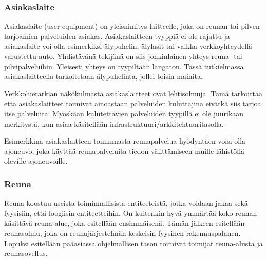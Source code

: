

\subsubsection{Asiakaslaite}
Asiakaslaite (user equipment) on yleisnimitys laitteelle, joka on reunan tai pilven tarjoamien palveluiden asiakas. 
Asiakaslaitteen tyyppiä ei ole rajattu ja asiakaslaite voi olla esimerkiksi älypuhelin, älylasit tai vaikka verkkoyhteydellä varustettu auto. 
Yhdistävänä tekijänä on siis jonkinlainen yhteys reuna- tai pilvipalveluihin. Yleisesti yhteys on tyypiltään langaton. 
Tässä tutkielmassa asiakaslaitteella tarkoitetaan älypuhelinta, jollei toisin mainita.

Verkkohierarkian näkökulmasta asiakaslaitteet ovat lehtisolmuja. Tämä tarkoittaa että asiakaslaitteet toimivat ainoastaan palveluiden kuluttajina eivätkä siis tarjoa itse palveluita. Myöskään kulutettavien palveluiden tyypillä ei ole juurikaan merkitystä, kun asiaa käsitellään infrastruktuuri/arkkitehtuuritasolla.

Esimerkkinä asiakaslaitteen toiminnasta reunapalvelua hyödyntäen voisi olla ajoneuvo, joka käyttää reunapalveluita tiedon välittämiseen muille lähistöllä oleville ajoneuvoille.




\subsubsection{Reuna}
Reuna koostuu useista toiminnallisista entiteeteistä, jotka voidaan jakaa sekä fyysisiin, että loogiisin entiteetteihin. On kuitenkin hyvä ymmärtää koko reunan käsittävä reuna-alue, joka esitellään ensimmäisenä. Tämän jälkeen esitellään reunasolmu, joka on reunajärjestelmän keskeisin fyysinen rakennuspalanen. Lopuksi esitellään pääasiassa ohjelmallisen tason toimivat toimijat reuna-alusta ja reunasovellus.


